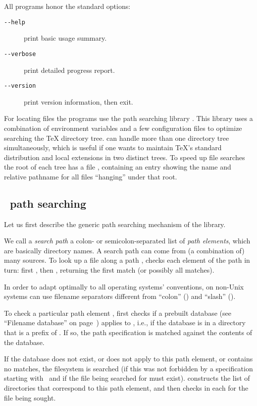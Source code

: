 \documentclass{article}
\def\hyph{-}
\begin{document}
All programs honor the standard  options:
\begin{description}
\item[\texttt{-{}-help\ \ \ }] print basic usage summary.
\item[\texttt{-{}-verbose}] print detailed progress report.
\item[\texttt{-{}-version}] print version information, then exit.
\end{description}

For locating files the \Webc{} programs use the path searching library
\KPS{}. This library uses a combination of environment variables and a
few configuration files to optimize searching the \TeX{} directory
tree. \Webc{} can handle more than one directory tree
simultaneously, which is useful if one wants to maintain \TeX's
standard distribution and local extensions in two distinct trees. To
speed up file searches the root of each tree has a file ,
containing an entry showing the name and relative pathname for all
files ``hanging'' under that root.

\subsection{\protect\KPS\ path searching}

Let us first describe the generic path searching mechanism of the \KPS{}
library. 

We call a \emph{search path} a colon- or semicolon\hyph sepa\-rated list
of \emph{path elements}, which are basically directory names.  A
search path can come from (a combination of) many sources.  To look up
a file  along a path , \KPS{} checks each
element of the path in turn: first , then
, returning the first match (or possibly all
matches).

In order to adapt optimally to all operating systems' conventions, on
non-Unix systems \KPS{} can use filename separators different from
``colon'' (\samp{:}) and ``slash'' (\samp{/}).

To check a particular path element , \KPS{} first checks if a
prebuilt database (see ``Filename data\-base'' on 
page~\pageref{Filename-database}) applies to , i.e., if the database
is in a directory that is a prefix of .  If so, the path
specification is matched against the contents of the database.

If the database does not exist, or does not apply to this path
element, or contains no matches, the filesystem is searched (if this
was not forbidden by a specification starting with \samp{!!}\ and if
the file being searched for must exist).  \KPS{} constructs the list
of directories that correspond to this path element, and then checks
in each for the file being sought.
\end{document}
